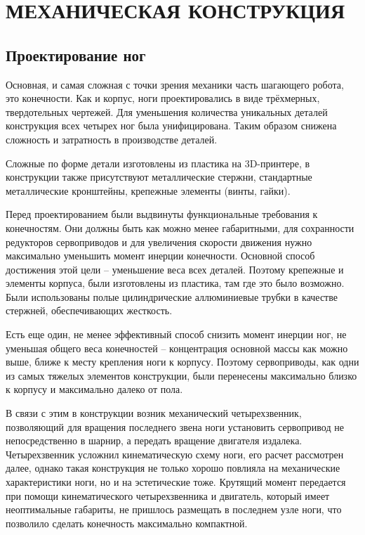 \chapter{\MakeUppercase{Механическая конструкция}}
\section{Проектирование ног}
Основная, и самая сложная с точки зрения механики часть шагающего робота, это конечности. Как и корпус, ноги проектировались в виде трёхмерных, твердотельных чертежей. Для уменьшения количества уникальных деталей конструкция всех четырех ног была унифицирована. Таким образом снижена сложность и затратность в производстве деталей. 

Сложные по форме детали изготовлены из пластика на 3D-принтере, в конструкции также присутствуют металлические стержни, стандартные металлические кронштейны, крепежные элементы (винты, гайки).

Перед проектированием были выдвинуты функциональные требования к конечностям. Они должны быть как можно менее габаритными, для сохранности редукторов сервоприводов и для увеличения скорости движения нужно максимально уменьшить момент инерции конечности. Основной способ достижения этой цели -- уменьшение веса всех деталей. Поэтому крепежные и элементы корпуса, были изготовлены из пластика, там где это было возможно. Были использованы полые цилиндрические аллюминиевые трубки в качестве стержней, обеспечивающих жесткость.

Есть еще один, не менее эффективный способ снизить момент инерции ног, не уменьшая общего веса конечностей -- концентрация основной массы как можно выше, ближе к месту крепления ноги к корпусу. Поэтому сервоприводы, как одни из самых тяжелых элементов конструкции, были перенесены максимально близко к корпусу и максимально далеко от пола.

В связи с этим в конструкции возник механический четырехзвенник, позволяющий для вращения последнего звена ноги установить сервопривод не непосредственно в шарнир, а передать вращение двигателя издалека. Четырехзвенник усложнил кинематическую схему ноги, его расчет рассмотрен далее, однако такая конструкция не только хорошо повлияла на механические характеристики ноги, но и на эстетические тоже. Крутящий момент передается при помощи кинематического четырехзвенника и двигатель, который имеет неоптимальные габариты, не пришлось размещать в последнем узле ноги, что позволило сделать конечность максимально компактной.

